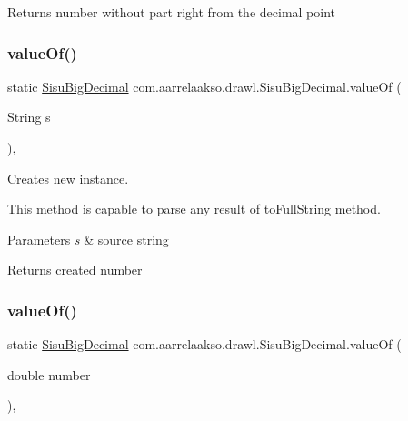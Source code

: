 \begin{DoxyReturn}{Returns}
number without part right from the decimal point 
\end{DoxyReturn}
\mbox{\label{classcom_1_1aarrelaakso_1_1drawl_1_1_sisu_big_decimal_a076ac8cd04ac04e39f7f3fcc7ce9a4a1}} 
\subsubsection{\texorpdfstring{value\+Of()}{valueOf()}\hspace{0.1cm}{\footnotesize\ttfamily [1/4]}}
{\footnotesize\ttfamily static \hyperlink{classcom_1_1aarrelaakso_1_1drawl_1_1_sisu_big_decimal}{Sisu\+Big\+Decimal} com.\+aarrelaakso.\+drawl.\+Sisu\+Big\+Decimal.\+value\+Of (\begin{DoxyParamCaption}\item[{String}]{s }\end{DoxyParamCaption})\hspace{0.3cm}{\ttfamily [static]}, {\ttfamily [protected]}}



Creates new instance. 

This method is capable to parse any result of to\+Full\+String method.


\begin{DoxyParams}{Parameters}
{\em s} & source string \\
\hline
\end{DoxyParams}
\begin{DoxyReturn}{Returns}
created number 
\end{DoxyReturn}
\mbox{\label{classcom_1_1aarrelaakso_1_1drawl_1_1_sisu_big_decimal_abdd37c9d8ee68f034fc15ca6777a1de7}} 
\subsubsection{\texorpdfstring{value\+Of()}{valueOf()}\hspace{0.1cm}{\footnotesize\ttfamily [2/4]}}
{\footnotesize\ttfamily static \hyperlink{classcom_1_1aarrelaakso_1_1drawl_1_1_sisu_big_decimal}{Sisu\+Big\+Decimal} com.\+aarrelaakso.\+drawl.\+Sisu\+Big\+Decimal.\+value\+Of (\begin{DoxyParamCaption}\item[{double}]{number }\end{DoxyParamCaption})\hspace{0.3cm}{\ttfamily [static]}, {\ttfamily [protected]}}



